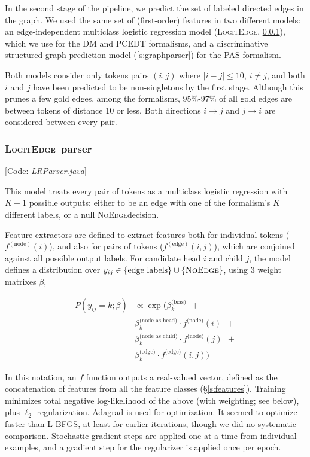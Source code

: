 \documentclass[11pt]{article}
\newcommand{\codenote}[1]{\textcolor{PineGreen}{[Code: \emph{#1}]}}
\newcommand{\logitedge}{\textsc{LogitEdge}}
\newcommand{\noedge}{\textsc{NoEdge}}
\begin{document}
In the second stage of the pipeline, we predict the set of labeled directed
edges in the graph.
We used the same set of (first-order) features
in two different models: an edge-independent multiclass %
logistic regression model (\logitedge, \ref{s:logitedge}), which we use for the
DM and PCEDT formalisms, and a discriminative structured graph prediction model
(\ref{s:graphparser}) for the PAS formalism.

Both models consider only tokens pairs $(i, j)$ where %
$|i-j| \leq 10$, $i \ne j$, and both $i$ and
$j$ have been predicted to be non-singletons by the first stage.
Although this prunes a few gold edges, among the formalisms, 95\%-97\% of all
gold edges are between tokens of distance 10 or less.
Both directions $i \rightarrow j$ and $j \rightarrow i$ are considered between
every pair.


\subsubsection{\logitedge\ parser} \label{s:logitedge}


\codenote{LRParser.java}

\noindent
This model treats every pair of tokens as a multiclass logistic regression
with $K+1$ possible outputs:
either to be an edge with one of the formalism's $K$ different labels, or a null
\noedge decision.  

Feature extractors are defined to extract features both for individual tokens ($f^{(\text{node})}(i)$), and also for pairs of tokens ($f^{(\text{edge})}(i,j)$), which are conjoined against all possible output labels.
For candidate head $i$ and child $j$, the model defines a distribution over
$y_{ij} \in \{\text{edge labels}\} \cup \{\noedge\}$, using $3$ weight matrixes
$\beta$,

\begin{align*} 
  P(y_{ij}=k; \beta) & \propto 
  \exp \big( \beta^{\text{(bias)}}_k \ \ + \\
  &
  \beta^{\text{(node as head)}}_k \cdot f^{\text{(node)}}(i)
  \ \ + \\ 
  &
  \beta^{\text{(node as child)}}_k \cdot f^{\text{(node)}}(j)
  \ \ + \\
  &
  \beta^{\text{(edge)}}_k \cdot f^{\text{(edge)}}(i,j)
    \big)
\end{align*}

\noindent
In this notation, an $f$ function outputs a real-valued vector, defined as the concatenation of features from all the feature classes (\S\ref{s:features}).
Training minimizes total negative log-likelihood of the above (with weighting; see below),
plus $\ell_2$ regularization.  Adagrad \cite{duchi2011adaptive} is used for optimization.
It seemed to optimize faster than L-BFGS, at least for earlier iterations, though we did no systematic comparison. Stochastic gradient steps are applied one at a time from individual examples, and a gradient step for the regularizer is applied once per epoch.
\end{document}
